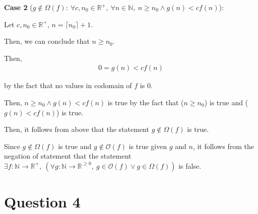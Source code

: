 \documentclass[12pt]{article}
\begin{document}
\begin{enumerate}[a.]
    \bigskip

    \textbf{Case 2} ($g \notin \Omega (f):\:\forall c,n_0 \in \mathbb{R}^{+},\:
    \forall n \in \mathbb{N},\:n \geq n_0 \land g(n) < cf(n)$):

    \bigskip

    Let $c,n_0 \in \mathbb{R}^{+}$, $n = \lceil n_0 \rceil + 1$.

    \bigskip

    Then, we can conclude that $n \geq n_0$.

    \bigskip

    Then,
    \setcounter{equation}{0}
    \begin{align}
        0 = g(n) < cf(n)
    \end{align}

    by the fact that no values in codomain of $f$ is 0.

    \bigskip

    Then, $n \geq n_0 \land g(n) < cf(n)$ is true by the fact that
    ($n \geq n_0$) is true and ($g(n) < cf(n)$) is true.

    \bigskip

    Then, it follows from above that the statement $g \notin \Omega(f)$ is true.

    \bigskip

    Since $g \notin \Omega(f)$  is true and $g \notin \mathcal{O}(f)$ is true given
    $g$ and $n$, it follows from the negation of statement that the statement $\exists
    f: \mathbb{N} \to \mathbb{R}^{+},\:(\forall g: \mathbb{N} \to \mathbb{R}^{\geq 0},\:
    g \in \mathcal{O}(f) \lor g \in \Omega(f))$ is false.

\end{enumerate}

\section*{Question 4}
\end{document}
